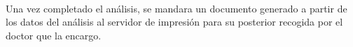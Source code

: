 \documentclass[a4paper,10pt]{article}
\begin{document}
\paragraph{}
Una vez completado el análisis, se mandara un documento generado a partir de los datos del análisis al servidor de impresión para su posterior recogida por el doctor que la encargo.\\





\end{document}

